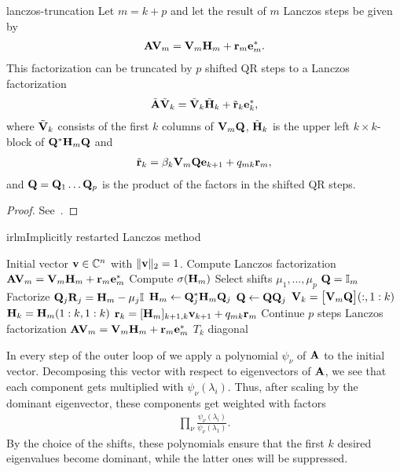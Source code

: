 \begin{Lemma}{lanczos-truncation}
  Let $m=k+p$ and let the result of $m$ Lanczos steps be given by
  \begin{gather}
    \mathbf A\mathbf V_m = \mathbf V_m\mathbf H_m + \mathbf r_m\mathbf e_m^*.
  \end{gather}
  This factorization can be truncated by $p$ shifted QR steps to a
  Lanczos factorization
    \begin{gather}
    \tilde{\mathbf A}\tilde{\mathbf V}_k = \tilde{\mathbf V}_k\tilde{\mathbf H}_k + \tilde{\mathbf r}_k\mathbf e_k^*,
  \end{gather}
  where $\tilde{\mathbf V}_k$ consists of the first $k$ columns of $\mathbf V_m\mathbf Q$, $\tilde{\mathbf H}_k$ is the upper left $k\times k$-block of $\mathbf Q^*\mathbf H_m\mathbf Q$ and
  \begin{gather}
    \tilde{\mathbf r}_k = \beta_k\mathbf V_m\mathbf Q \mathbf e_{k+1} + q_{mk} \mathbf r_m ,
  \end{gather}
  and $\mathbf Q=\mathbf Q_1\dots\mathbf Q_p$ is the product of the factors in the
  shifted QR steps.
\end{Lemma}

\begin{proof}
  See~\cite[Section 4.5.1]{BaiDemmelDongarraRuhevanderVorst00}.
\end{proof}

\begin{Algorithm*}{irlm}{Implicitly restarted Lanczos method}
  \begin{algorithmic}[1]
    \Require Initial vector $\mathbf v\in\mathbb C^n$ with $\lVert\mathbf v\rVert_2=1$.
    \State Compute Lanczos factorization
    $\mathbf A\mathbf V_m = \mathbf V_m\mathbf H_m + \mathbf r_m\mathbf e_m^*$
    \Repeat
    \State Compute $\sigma(\mathbf H_m)$
    \State Select shifts $\mu_1,\dots,\mu_p$
    \State $\mathbf Q = \mathbb I_m$
    \State Factorize $\mathbf Q_j\mathbf R_j = \mathbf H_m - \mu_j\mathbb I$
    \State $\mathbf H_m \gets \mathbf Q_j^*\mathbf H_m\mathbf Q_j$
    \State $\mathbf Q \gets \mathbf Q\mathbf Q_j$
    \EndFor
    \State $\mathbf V_k = \bigl[\mathbf V_m\mathbf Q\bigr](:,1:k)$
    \State $\mathbf H_k = \mathbf H_m(1:k,1:k)$
    \State $\mathbf r_k= [\mathbf H_m]_{k+1,k}\mathbf v_{k+1} + q_{mk}\mathbf r_m$
    \State Continue $p$ steps Lanczos factorization
    $\mathbf A\mathbf V_m = \mathbf V_m\mathbf H_m + \mathbf r_m\mathbf e_m^*$
    \Until $T_k$ diagonal
  \end{algorithmic}
\end{Algorithm*}

\begin{remark}
  In every step of the outer loop of  we
  apply a polynomial $\psi_\nu$ of $\mathbf A$ to the initial
  vector. Decomposing this vector with respect to eigenvectors of
  $\mathbf A$, we see that each component gets multiplied with
  $\psi_\nu(\lambda_i)$. Thus, after scaling by the dominant
  eigenvector, these components get weighted with factors
  \begin{gather}
    \prod_\nu\frac{\psi_\nu(\lambda_i)}{\psi_\nu(\lambda_1)}.
  \end{gather}
  By the choice of the shifts, these polynomials ensure that the first
  $k$ desired eigenvalues become dominant, while the latter ones will
  be suppressed.
\end{remark}

